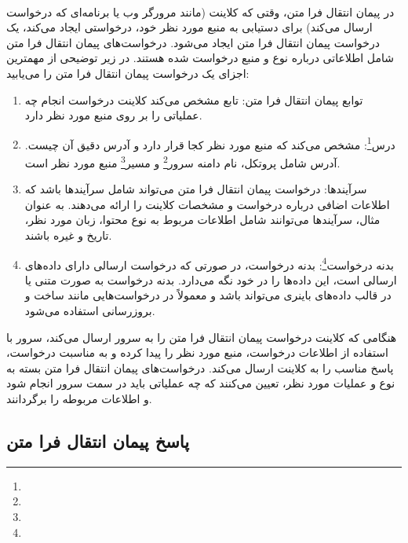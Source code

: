 \paragraph{}
{
    در پیمان انتقال فرا متن، وقتی که کلاینت (مانند مرورگر وب یا برنامه‌ای که درخواست ارسال می‌کند) برای دستیابی به منبع مورد نظر خود، درخواستی ایجاد می‌کند، یک درخواست پیمان انتقال فرا متن ایجاد می‌شود. درخواست‌های پیمان انتقال فرا متن شامل اطلاعاتی درباره نوع و منبع درخواست شده هستند. در زیر توضیحی از مهمترین اجزای یک درخواست پیمان انتقال فرا متن را می‌یابید:
    \begin{enumerate}
        \item توابع پیمان انتقال فرا متن: تابع مشخص می‌کند کلاینت درخواست انجام چه عملیاتی را بر روی منبع مورد نظر دارد.
        \item درس\footnote{}: مشخص می‌کند که منبع مورد نظر کجا قرار دارد و آدرس دقیق آن چیست. آدرس شامل پروتکل، نام دامنه سرور\footnote{} و مسیر\footnote{} منبع مورد نظر است.
        \item سرآیندها: درخواست پیمان انتقال فرا متن می‌تواند شامل سرآیندها باشد که اطلاعات اضافی درباره درخواست و مشخصات کلاینت را ارائه می‌دهند. به عنوان مثال، سرآیندها می‌توانند شامل اطلاعات مربوط به نوع محتوا، زبان مورد نظر، تاریخ و غیره باشند.
        \item بدنه درخواست\footnote{}: بدنه درخواست، در صورتی که درخواست ارسالی دارای داده‌های ارسالی است، این داده‌ها را در خود نگه می‌دارد. بدنه درخواست به صورت متنی یا در قالب داده‌های باینری می‌تواند باشد و معمولاً در درخواست‌هایی مانند ساخت و بروزرسانی استفاده می‌شود.
    \end{enumerate}
    هنگامی که کلاینت درخواست پیمان انتقال فرا متن را به سرور ارسال می‌کند، سرور با استفاده از اطلاعات درخواست، منبع مورد نظر را پیدا کرده و به مناسبت درخواست، پاسخ مناسب را به کلاینت ارسال می‌کند. درخواست‌های پیمان انتقال فرا متن بسته به نوع و عملیات مورد نظر، تعیین می‌کنند که چه عملیاتی باید در سمت سرور انجام شود و اطلاعات مربوطه را برگردانند.
}

\subsection{پاسخ‌ پیمان انتقال فرا متن}
\label{subsec:http_responses}
